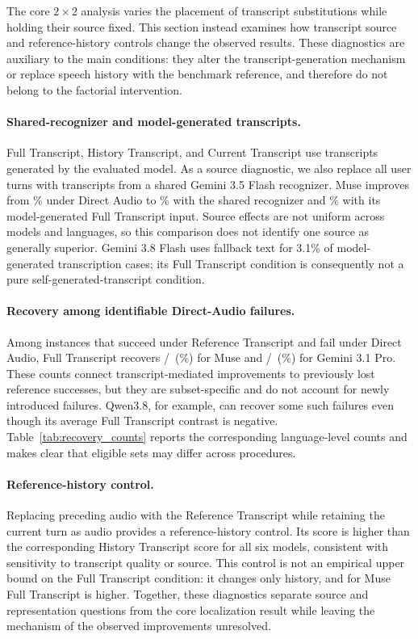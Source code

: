 The core $2\times2$ analysis varies the placement of transcript substitutions while holding their source fixed. This section instead examines how transcript source and reference-history controls change the observed results. These diagnostics are auxiliary to the main conditions: they alter the transcript-generation mechanism or replace speech history with the benchmark reference, and therefore do not belong to the factorial intervention.

\paragraph{Shared-recognizer and model-generated transcripts.}
Full Transcript, History Transcript, and Current Transcript use transcripts generated by the evaluated model. As a source diagnostic, we also replace all user turns with transcripts from a shared Gemini 3.5 Flash recognizer. Muse improves from \resMuseAudio\% under Direct Audio to \resMuseShared\% with the shared recognizer and \resMuseSelf\% with its model-generated Full Transcript input. Source effects are not uniform across models and languages, so this comparison does not identify one source as generally superior. Gemini 3.8 Flash uses fallback text for 3.1\% of model-generated transcription cases; its Full Transcript condition is consequently not a pure self-generated-transcript condition.

\paragraph{Recovery among identifiable Direct-Audio failures.}
Among instances that succeed under Reference Transcript and fail under Direct Audio, Full Transcript recovers \resMuseSelfRecovered/\resMuseSelfLost\ (\resMuseSelfRecovery\%) for Muse and \resGProSelfRecovered/\resGProSelfLost\ (\resGProSelfRecovery\%) for Gemini 3.1 Pro. These counts connect transcript-mediated improvements to previously lost reference successes, but they are subset-specific and do not account for newly introduced failures. Qwen3.8, for example, can recover some such failures even though its average Full Transcript contrast is negative. Table~\ref{tab:recovery_counts} reports the corresponding language-level counts and makes clear that eligible sets may differ across procedures.

\paragraph{Reference-history control.}
Replacing preceding audio with the Reference Transcript while retaining the current turn as audio provides a reference-history control. Its score is higher than the corresponding History Transcript score for all six models, consistent with sensitivity to transcript quality or source. This control is not an empirical upper bound on the Full Transcript condition: it changes only history, and for Muse Full Transcript is higher. Together, these diagnostics separate source and representation questions from the core localization result while leaving the mechanism of the observed improvements unresolved.
